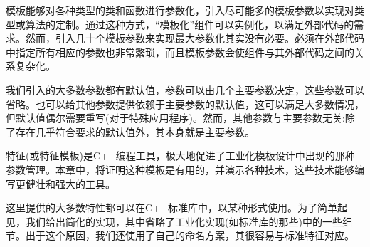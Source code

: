 模板能够对各种类型的类和函数进行参数化，引入尽可能多的模板参数以实现对类型或算法的定制。通过这种方式，“模板化”组件可以实例化，以满足外部代码的需求。然而，引入几十个模板参数来实现最大参数化其实没有必要。必须在外部代码中指定所有相应的参数也非常繁琐，而且模板参数会使组件与其外部代码之间的关系复杂化。

我们引入的大多数参数都有默认值，参数可以由几个主要参数决定，这些参数可以省略。也可以给其他参数提供依赖于主要参数的默认值，这可以满足大多数情况，但默认值偶尔需要重写(对于特殊应用程序)。然而，其他参数与主要参数无关:除了存在几乎符合要求的默认值外，其本身就是主要参数。

特征(或特征模板)是C++编程工具，极大地促进了工业化模板设计中出现的那种参数管理。本章中，将证明这种模板是有用的，并演示各种技术，这些技术能够编写更健壮和强大的工具。

这里提供的大多数特性都可以在C++标准库中，以某种形式使用。为了简单起见，我们给出简化的实现，其中省略了工业化实现(如标准库的那些)中的一些细节。出于这个原因，我们还使用了自己的命名方案，其很容易与标准特征对应。